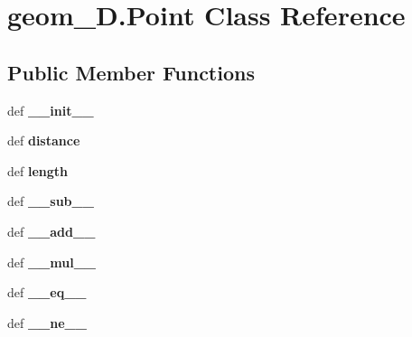 \hypertarget{classgeom__2D_1_1Point}{\section{geom\-\_\-D.\-Point \-Class \-Reference}
\label{classgeom__2D_1_1Point}
}
\subsection*{\-Public \-Member \-Functions}
\begin{DoxyCompactItemize}
\item 
\hypertarget{classgeom__2D_1_1Point_a0719e9b16807d67fe54bd6f403b4de66}{def {\bfseries \-\_\-\-\_\-init\-\_\-\-\_\-}}\label{classgeom__2D_1_1Point_a0719e9b16807d67fe54bd6f403b4de66}

\item 
\hypertarget{classgeom__2D_1_1Point_a60c63f869a73d672d62062e0994c53a3}{def {\bfseries distance}}\label{classgeom__2D_1_1Point_a60c63f869a73d672d62062e0994c53a3}

\item 
\hypertarget{classgeom__2D_1_1Point_ab6fd0b9254feb3c38ff5226533d8e1ea}{def {\bfseries length}}\label{classgeom__2D_1_1Point_ab6fd0b9254feb3c38ff5226533d8e1ea}

\item 
\hypertarget{classgeom__2D_1_1Point_aae78acc174410b476e1cda95d6e55e6d}{def {\bfseries \-\_\-\-\_\-sub\-\_\-\-\_\-}}\label{classgeom__2D_1_1Point_aae78acc174410b476e1cda95d6e55e6d}

\item 
\hypertarget{classgeom__2D_1_1Point_a092380f0f0fd065923955321e8024275}{def {\bfseries \-\_\-\-\_\-add\-\_\-\-\_\-}}\label{classgeom__2D_1_1Point_a092380f0f0fd065923955321e8024275}

\item 
\hypertarget{classgeom__2D_1_1Point_aec091718703ea34a22c47aeaf3ec697b}{def {\bfseries \-\_\-\-\_\-mul\-\_\-\-\_\-}}\label{classgeom__2D_1_1Point_aec091718703ea34a22c47aeaf3ec697b}

\item 
\hypertarget{classgeom__2D_1_1Point_a28c0e8d4c5335abed5c0265a55d3da9d}{def {\bfseries \-\_\-\-\_\-eq\-\_\-\-\_\-}}\label{classgeom__2D_1_1Point_a28c0e8d4c5335abed5c0265a55d3da9d}

\item 
\hypertarget{classgeom__2D_1_1Point_a6a347335e1ec8080de18982a2d2ea9d4}{def {\bfseries \-\_\-\-\_\-ne\-\_\-\-\_\-}}\label{classgeom__2D_1_1Point_a6a347335e1ec8080de18982a2d2ea9d4}


\end{DoxyCompactItemize}
